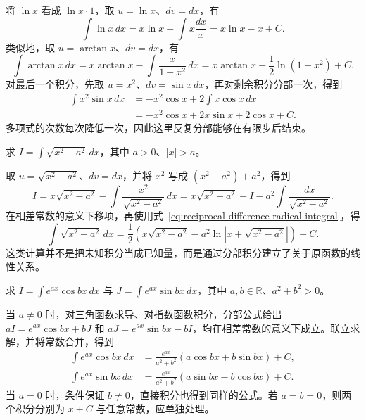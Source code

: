 \documentclass[UTF8,12pt,a4paper,fontset=fandol]{ctexbook}
\begin{document}
\begin{solve}
将 $\ln x$ 看成 $\ln x\cdot1$，取 $u=\ln x$、$dv=dx$，有
\[
    \int\ln x\,dx=x\ln x-\int x\frac{dx}{x}
       =x\ln x-x+C.
\]
类似地，取 $u=\arctan x$、$dv=dx$，有
\[
    \int\arctan x\,dx
       =x\arctan x-\int\frac{x}{1+x^2}\,dx
       =x\arctan x-\frac12\ln(1+x^2)+C.
\]
对最后一个积分，先取 $u=x^2$、$dv=\sin x\,dx$，再对剩余积分分部一次，得到
\begin{align*}
    \int x^2\sin x\,dx
       &=-x^2\cos x+2\int x\cos x\,dx\\
       &=-x^2\cos x+2x\sin x+2\cos x+C.
\end{align*}
多项式的次数每次降低一次，因此这里反复分部能够在有限步后结束。
\end{solve}

\begin{example}
\label{ex:integration-by-parts-radical}
求 $\displaystyle I=\int\sqrt{x^2-a^2}\,dx$，其中 $a>0$、$|x|>a$。
\end{example}

\begin{solve}
取 $u=\sqrt{x^2-a^2}$、$dv=dx$，并将 $x^2$ 写成 $(x^2-a^2)+a^2$，得到
\[
    I=x\sqrt{x^2-a^2}-\int\frac{x^2}{\sqrt{x^2-a^2}}\,dx
      =x\sqrt{x^2-a^2}-I-a^2\int\frac{dx}{\sqrt{x^2-a^2}}.
\]
在相差常数的意义下移项，再使用式~\eqref{eq:reciprocal-difference-radical-integral}，得
\begin{equation}
    \int\sqrt{x^2-a^2}\,dx
      =\frac12\left(x\sqrt{x^2-a^2}
             -a^2\ln|x+\sqrt{x^2-a^2}|\right)+C.
    \label{eq:difference-radical-integral}
\end{equation}
这类计算并不是把未知积分当成已知量，而是通过分部积分建立了关于原函数的线性关系。
\end{solve}

\begin{example}
\label{ex:cyclic-exponential-trigonometric-integrals}
求 $\displaystyle I=\int e^{ax}\cos bx\,dx$ 与 $\displaystyle J=\int e^{ax}\sin bx\,dx$，其中 $a,b\in\mathbb{R}$、$a^2+b^2>0$。
\end{example}

\begin{solve}
当 $a\neq0$ 时，对三角函数求导、对指数函数积分，分部公式给出 $aI=e^{ax}\cos bx+bJ$ 和 $aJ=e^{ax}\sin bx-bI$，均在相差常数的意义下成立。联立求解，并将常数合并，得到
\begin{align}
    \int e^{ax}\cos bx\,dx
      &=\frac{e^{ax}}{a^2+b^2}(a\cos bx+b\sin bx)+C,
        \label{eq:exponential-cosine-integral}\\
    \int e^{ax}\sin bx\,dx
      &=\frac{e^{ax}}{a^2+b^2}(a\sin bx-b\cos bx)+C.
        \label{eq:exponential-sine-integral}
\end{align}
当 $a=0$ 时，条件保证 $b\neq0$，直接积分也得到同样的公式。若 $a=b=0$，则两个积分分别为 $x+C$ 与任意常数，应单独处理。
\end{solve}
\end{document}
